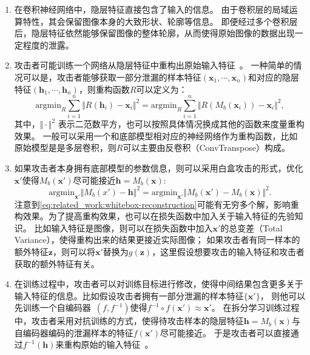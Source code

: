 \begin{enumerate}
    \item 在卷积神经网络中，隐层特征直接包含了输入的信息\cite{abuadbba2020can_split}。
    由于卷积层的局域运算特性，其会保留图像本身的大致形状、轮廓等信息。
    即便经过多个卷积层后，隐层特征依然能够保留图像的整体轮廓，从而使得原始图像的数据出现一定程度的泄露。
    \item 攻击者可能训练一个网络从隐层特征中重构出原始输入特征~\cite{vepakomma2020nopeek,hezecheng_2019_model_inversion_attack}。
    一种简单的情况可以是，攻击者能够获取一部分泄漏的样本特征$(\mathbf x_1, \cdots, \mathbf x_n)$和对应的隐层特征$(\mathbf h_1, \cdots, \mathbf h_n)$，则重构函数$R$可以定义为：
    \begin{equation}
        \text{argmin}_{R} \sum_{i=1}^n \Vert R(\mathbf h_i) - \mathbf x_i\Vert^2 = \text{argmin}_{R} \sum_{i=1}^n \Vert R(M_b(\mathbf x_i)) - \mathbf x_i\Vert^2,
    \end{equation}
    其中，$\Vert \cdot\Vert^2$ 表示二范数平方，也可以按照具体情况换成其他的函数来度量重构效果。
    一般可以采用一个和底部模型相对应的神经网络作为重构函数，比如原始模型是是多层卷积，则$R$可以主要由反卷积（ConvTranspose）构成。
    \item 如果攻击者本身拥有底部模型的参数信息，则可以采用白盒攻击的形式，优化$\mathbf x'$使得$M_b(\mathbf x')$尽可能接近$\mathbf h = M_b(\mathbf x)$:~\cite{hezecheng_2019_model_inversion_attack,luoxinjian2021feature_attack}
    \begin{equation}
    \label{eq:related_work:whitebox-reconstruction}
        \text{argmin}_{\mathbf x'} \Vert M_b(x') - \mathbf h\Vert^2 = \text{argmin}_{\mathbf x'} \Vert M_b(\mathbf x') - M_b(\mathbf x)\Vert^2.
    \end{equation}
    注意到\autoref{eq:related_work:whitebox-reconstruction}可能有无穷多个解，影响重构效果。为了提高重构效果，也可以在损失函数中加入关于输入特征的先验知识。
    比如输入特征是图像，则可以在损失函数中加入$\mathbf x'$的总变差（Total Variance），使得重构出来的结果更接近实际图像；
    如果攻击者有同一样本的额外特征$\mathbf z$，则可以将$\mathbf x'$替换为$g(\mathbf z)$，这里假设想要攻击的输入特征和攻击者获取的额外特征有关。
    \item 在训练过程中，攻击者可以对训练目标进行修改，使得中间结果包含更多关于输入特征的信息。比如假设攻击者拥有一部分泄漏的样本特征$\{ \mathbf x' \}$，
    则他可以先训练一个自编码器~\cite{kramer1991autoencoder,baldi2012autoencoders}$(f,f^{-1})$使得$f^{-1}\circ f(\mathbf x')\approx \mathbf x'$。
    在拆分学习训练过程中，攻击者采用对抗训练的方式，使得待攻击样本的隐层特征$\mathbf h = M_b(\mathbf x)$与自编码器编码的泄漏样本的特征$f(\mathbf x')$尽可能接近。
    于是攻击者可以直接通过$f^{-1}(\mathbf h)$来重构原始的输入特征~\cite{pasquini2921inference_attack_tiger}。
\end{enumerate}

